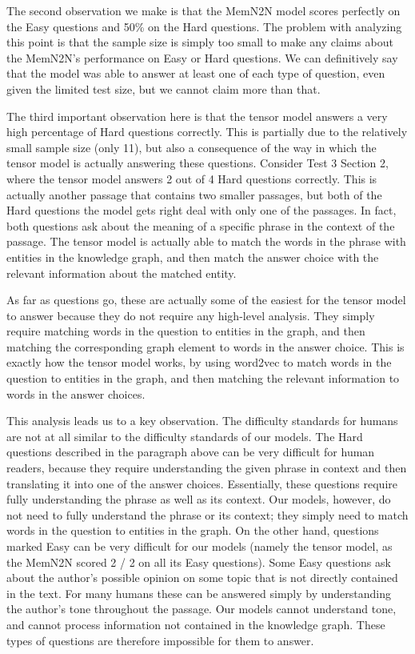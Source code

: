 \documentclass[pageno]{final_paper}
\begin{document}
The second observation we make is that the MemN2N model scores perfectly on the
Easy questions and 50\% on the Hard questions. The problem with analyzing this
point is that the sample size is simply too small to make any claims about the
MemN2N's performance on Easy or Hard questions. We can definitively say that
the model was able to answer at least one of each type of question, even given
the limited test size, but we cannot claim more than that.

The third important observation here is that the tensor model answers a very
high percentage of Hard questions correctly. This is partially due to the
relatively small sample size (only 11), but also a consequence of the way in
which the tensor model is actually answering these questions. Consider Test 3
Section 2, where the tensor model answers 2 out of 4 Hard questions correctly.
This is actually another passage that contains two smaller passages, but both of
the Hard questions the model gets right deal with only one of the passages. In
fact, both questions ask about the meaning of a specific phrase in the context
of the passage. The tensor model is actually able to match the words in the
phrase with entities in the knowledge graph, and then match the answer choice
with the relevant information about the matched entity.

As far as questions go, these are actually some of the easiest for the tensor
model to answer because they do not require any high-level analysis. They simply
require matching words in the question to entities in the graph, and then
matching the corresponding graph element to words in the answer choice. This
is exactly how the tensor model works, by using word2vec to match words in the
question to entities in the graph, and then matching the relevant information to
words in the answer choices.

This analysis leads us to a key observation. The difficulty standards for humans
are not at all similar to the difficulty standards of our models. The Hard
questions described in the paragraph above can be very difficult for human
readers, because they require understanding the given phrase in context and then
translating it into one of the answer choices. Essentially, these questions
require fully understanding the phrase as well as its context. Our models,
however, do not need to fully understand the phrase or its context; they simply
need to match words in the question to entities in the graph. On the other hand,
questions marked Easy can be very difficult for our models (namely the tensor model,
as the MemN2N scored 2 / 2 on all its Easy questions). Some Easy questions ask
about the author's possible opinion on some topic that is not directly contained
in the text. For many humans these can be answered simply by understanding the
author's tone throughout the passage. Our models cannot understand tone, and
cannot process information not contained in the knowledge graph. These types
of questions are therefore impossible for them to answer.
\end{document}
